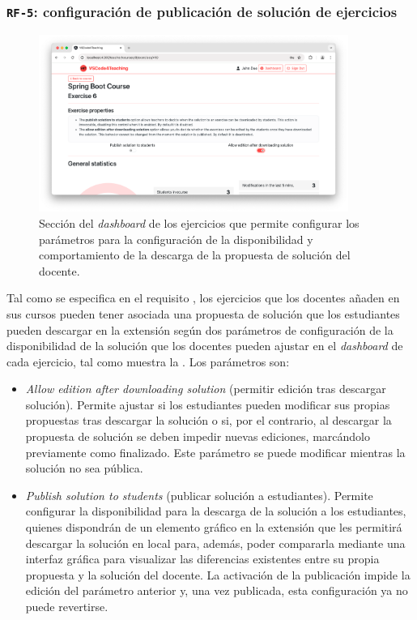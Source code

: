 \subsubsection{\texttt{RF-5}: configuración de publicación de solución de ejercicios}
\label{subsec:rf5}

\begin{figure}[!ht]
    \centering
    \includegraphics[width=0.9\textwidth]{imagenes/utilizadas/4-3-implementacion/rf5-1.png}
    \caption{Sección del \textit{dashboard} de los ejercicios que permite configurar los parámetros para la configuración de la disponibilidad y comportamiento de la descarga de la propuesta de solución del docente.}
    \label{fig:reqf5-1}
\end{figure}

Tal como se especifica en el requisito , los ejercicios que los docentes añaden en sus cursos pueden tener asociada una propuesta de solución que los estudiantes pueden descargar en la extensión según dos parámetros de configuración de la disponibilidad de la solución que los docentes pueden ajustar en el \textit{dashboard} de cada ejercicio, tal como muestra la . Los parámetros son:
\begin{itemize}
    \item \textit{Allow edition after downloading solution} (permitir edición tras descargar solución). Permite ajustar si los estudiantes pueden modificar sus propias propuestas tras descargar la solución o si, por el contrario, al descargar la propuesta de solución se deben impedir nuevas ediciones, marcándolo previamente como finalizado. Este parámetro se puede modificar mientras la solución no sea pública.
    \item \textit{Publish solution to students} (publicar solución a estudiantes). Permite configurar la disponibilidad para la descarga de la solución a los estudiantes, quienes dispondrán de un elemento gráfico en la extensión que les permitirá descargar la solución en local para, además, poder compararla mediante una interfaz gráfica para visualizar las diferencias existentes entre su propia propuesta y la solución del docente. La activación de la publicación impide la edición del parámetro anterior y, una vez publicada, esta configuración ya no puede revertirse.
\end{itemize}
